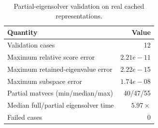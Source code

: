 \begin{table}[t]
\centering
\caption{Partial-eigensolver validation on real cached representations.}
\label{tab:partial_eigensolver_validation}
\footnotesize
\setlength{\tabcolsep}{4pt}
\begin{tabular}{lr}
\toprule
\textbf{Quantity} & \textbf{Value} \\
\midrule
Validation cases & 12 \\
Maximum relative score error & $2.21e-11$ \\
Maximum retained-eigenvalue error & $2.22e-15$ \\
Maximum subspace error & $1.74e-08$ \\
Partial matvecs (min/median/max) & 40/47/55 \\
Median full/partial eigensolver time & $5.97\times$ \\
Failed cases & 0 \\
\bottomrule
\end{tabular}
\end{table}
